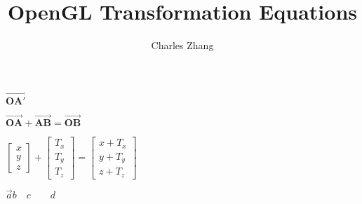 \documentclass[12pt]{article}
\title{OpenGL Transformation Equations}
\author{Charles Zhang}
\begin{document}
\maketitle




$
\boldsymbol{\overrightarrow{OA'}}
$

\vspace{4ex}

$
\boldsymbol{\overrightarrow{OA}} + \boldsymbol{\overrightarrow{AB}} = \boldsymbol{\overrightarrow{OB}}
$

\vspace{4ex}

$
\begin{bmatrix} 
x \\ 
y \\
z
\end{bmatrix}
+
\begin{bmatrix} 
T_x \\
T_y \\
T_z 
\end{bmatrix}
=
\begin{bmatrix} 
x + T_x \\ 
y + T_y \\
z + T_z
\end{bmatrix}
$


\vspace{4ex}

$
\vec a b\quad c\quad\quad d
$
\end{document}

